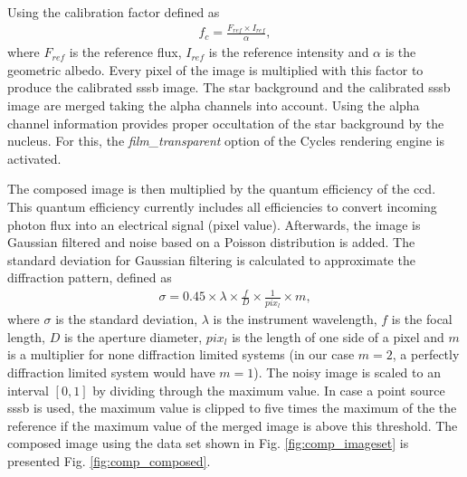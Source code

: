 Using the calibration factor defined as
\begin{align}
    f_c = \frac{F_{ref} \times I_{ref}}{\alpha}, \label{eq:comp_cal_fac}
\end{align}
where $F_{ref}$ is the reference flux, $I_{ref}$ is the reference intensity and $\alpha$ is the geometric albedo. Every pixel of the image is multiplied with this factor to produce the calibrated \gls{sssb} image. The star background and the calibrated \gls{sssb} image are merged taking the alpha channels into account. Using the alpha channel information provides proper occultation of the star background by the nucleus. For this, the \textit{film\_transparent} option of the Cycles rendering engine is activated.

The composed image is then multiplied by the quantum efficiency of the \gls{ccd}. This quantum efficiency currently includes all efficiencies to convert incoming photon flux into an electrical signal (pixel value). Afterwards, the image is Gaussian filtered and noise based on a Poisson distribution is added. The standard deviation for Gaussian filtering is calculated to approximate the diffraction pattern, defined as
\begin{align}
    \sigma = 0.45 \times \lambda \times \frac{f}{D}\times \frac{1}{pix_l} \times m, \label{eq:comp_sigma}
\end{align}
where $\sigma$ is the standard deviation, $\lambda$ is the instrument wavelength, $f$ is the focal length, $D$ is the aperture diameter, $pix_l$ is the length of one side of a pixel and $m$ is a multiplier for none diffraction limited systems (in our case $m = 2$, a perfectly diffraction limited system would have $m = 1$). The noisy image is scaled to an interval $[0,1]$ by dividing through the maximum value. In case a point source \gls{sssb} is used, the maximum value is clipped to five times the maximum of the the reference if the maximum value of the merged image is above this threshold. The composed image using the data set shown in Fig. \ref{fig:comp_imageset} is presented Fig. \ref{fig:comp_composed}.

